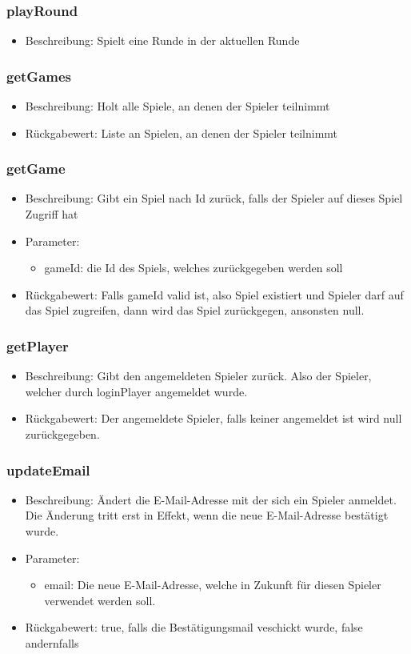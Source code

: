\documentclass[a4paper]{scrreprt}
\begin{document}
	\subsubsection{playRound}
	\begin{itemize}
		\item Beschreibung: Spielt eine Runde in der aktuellen Runde
	\end{itemize}
	\subsubsection{getGames}
	\begin{itemize}
		\item Beschreibung: Holt alle Spiele, an denen der Spieler teilnimmt
		\item Rückgabewert: Liste an Spielen, an denen der Spieler teilnimmt
	\end{itemize}
	\subsubsection{getGame}
	\begin{itemize}
		\item Beschreibung: Gibt ein Spiel nach Id zurück, falls der Spieler auf dieses Spiel Zugriff hat
		\item Parameter:
		\begin{itemize}
			\item gameId: die Id des Spiels, welches zurückgegeben werden soll
		\end{itemize}
		\item Rückgabewert: Falls gameId valid ist, also Spiel existiert und Spieler darf auf das Spiel zugreifen, dann wird das Spiel zurückgegen, ansonsten null.
	\end{itemize}
	\subsubsection{getPlayer}
	\begin{itemize}
		\item Beschreibung: Gibt den angemeldeten Spieler zurück. Also der Spieler, welcher durch loginPlayer angemeldet wurde.
		\item Rückgabewert: Der angemeldete Spieler, falls keiner angemeldet ist wird null zurückgegeben.
	\end{itemize}
	\subsubsection{updateEmail}
	\begin{itemize}
		\item Beschreibung: Ändert die E-Mail-Adresse mit der sich ein Spieler anmeldet. Die Änderung tritt erst in Effekt, wenn die neue E-Mail-Adresse bestätigt wurde.
		\item Parameter:
		\begin{itemize}
			\item email: Die neue E-Mail-Adresse, welche in Zukunft für diesen Spieler verwendet werden soll.
		\end{itemize}
		\item Rückgabewert: true, falls die Bestätigungsmail veschickt wurde, false andernfalls
	\end{itemize}
\end{document}

